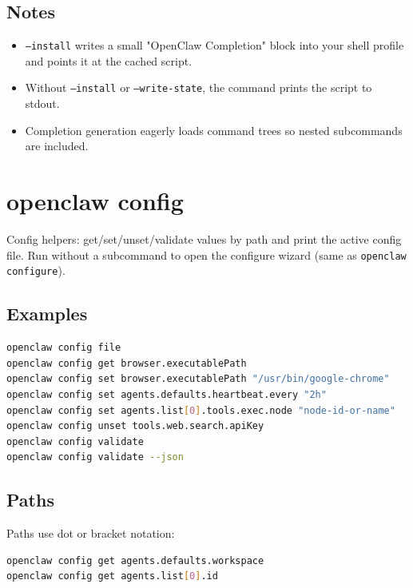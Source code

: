 \subsection{Notes}


\begin{itemize}
  \item \texttt{--install} writes a small "OpenClaw Completion" block into your shell profile and points it at the cached script.
  \item Without \texttt{--install} or \texttt{--write-state}, the command prints the script to stdout.
  \item Completion generation eagerly loads command trees so nested subcommands are included.
\end{itemize}



\clearpage

\section{openclaw config}


Config helpers: get/set/unset/validate values by path and print the active
config file. Run without a subcommand to open
the configure wizard (same as \texttt{openclaw configure}).

\subsection{Examples}


\begin{lstlisting}[language=bash]
openclaw config file
openclaw config get browser.executablePath
openclaw config set browser.executablePath "/usr/bin/google-chrome"
openclaw config set agents.defaults.heartbeat.every "2h"
openclaw config set agents.list[0].tools.exec.node "node-id-or-name"
openclaw config unset tools.web.search.apiKey
openclaw config validate
openclaw config validate --json
\end{lstlisting}


\subsection{Paths}


Paths use dot or bracket notation:

\begin{lstlisting}[language=bash]
openclaw config get agents.defaults.workspace
openclaw config get agents.list[0].id
\end{lstlisting}


